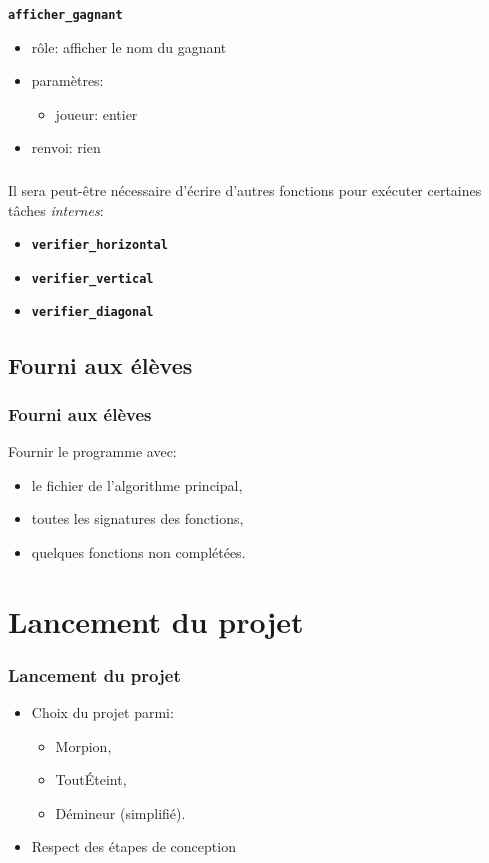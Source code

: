 \documentclass[svgnames,11pt]{beamer}
\begin{document}
\begin{frame}

    {\Large \textbf{\texttt{afficher\_gagnant}}}
    \begin{itemize}
        \item rôle: afficher le nom du gagnant 
        \item paramètres:
        \begin{itemize}
            \item joueur: entier
        \end{itemize}
        \item renvoi: rien
    \end{itemize}

\end{frame}
\begin{frame}
    \frametitle{}

\begin{aretenir}[Observation]
Il sera peut-être nécessaire d'écrire d'autres fonctions pour exécuter certaines tâches \emph{internes}:
\begin{itemize}
    \item \textbf{\texttt{verifier\_horizontal}}
    \item \textbf{\texttt{verifier\_vertical}}
    \item \textbf{\texttt{verifier\_diagonal}}
\end{itemize}
\end{aretenir}
\end{frame}
\subsection{Fourni aux élèves}
\begin{frame}
    \frametitle{Fourni aux élèves}

    Fournir le programme avec:
        \begin{itemize}
            \item le fichier de l'algorithme principal,
            \item toutes les signatures des fonctions,
            \item quelques fonctions non complétées.
        \end{itemize}

\end{frame}
\section{Lancement du projet}
\begin{frame}
    \frametitle{Lancement du projet}
\begin{itemize}
    \item <1->Choix du projet parmi:
    \begin{itemize}
        \item Morpion,
        \item ToutÉteint,
        \item Démineur (simplifié).
    \end{itemize}
    \item <2->Respect des étapes de conception
\end{itemize}
    

\end{frame}
\end{document}
